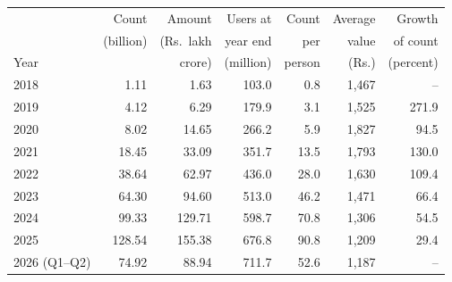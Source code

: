 \begin{tabular}{@{}l r r r r r r@{}}
\toprule
 & Count & Amount & Users at & Count & Average & Growth \\
 & (billion) & (Rs.\ lakh & year end & per & value & of count \\
Year & & crore) & (million) & person & (Rs.) & (percent) \\
\midrule
2018 & 1.11 & 1.63 & 103.0 & 0.8 & 1{,}467 & -- \\
2019 & 4.12 & 6.29 & 179.9 & 3.1 & 1{,}525 & 271.9 \\
2020 & 8.02 & 14.65 & 266.2 & 5.9 & 1{,}827 & 94.5 \\
2021 & 18.45 & 33.09 & 351.7 & 13.5 & 1{,}793 & 130.0 \\
2022 & 38.64 & 62.97 & 436.0 & 28.0 & 1{,}630 & 109.4 \\
2023 & 64.30 & 94.60 & 513.0 & 46.2 & 1{,}471 & 66.4 \\
2024 & 99.33 & 129.71 & 598.7 & 70.8 & 1{,}306 & 54.5 \\
2025 & 128.54 & 155.38 & 676.8 & 90.8 & 1{,}209 & 29.4 \\
2026 (Q1--Q2) & 74.92 & 88.94 & 711.7 & 52.6 & 1{,}187 & -- \\
\bottomrule
\end{tabular}
